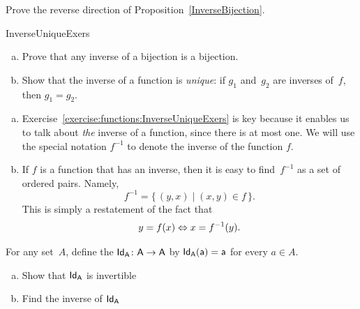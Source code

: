 \begin{exercise}{}
Prove the reverse direction of Proposition~\ref{InverseBijection}.
\end{exercise}

 \begin{exercise}{InverseUniqueExers} 
 \begin{enumerate}[(a)]
 \item \label{InverseUniqueExers-bij}
 Prove that any inverse of a bijection is a bijection.
 \item \label{InverseUniqueExers-unique}
 Show that the inverse of a function is \emph{unique}: if $g_1$ and~$g_2$ are inverses of~$f$, then $g_1 = g_2$. 
 \end{enumerate}
 \end{exercise}

\begin{rem}
\begin{enumerate}[(a)]
\item
Exercise~\ref{exercise:functions:InverseUniqueExers} is key because it enables us to talk about \emph{the} inverse of a function, since there is at most one. We will use the special notation $f^{-1}$ to denote the inverse of the function $f$.
\item
If $f$ is a function that has an inverse, then it is easy to find~$f^{-1}$ as a set of ordered pairs. Namely, 
$$ f^{-1} = \{\, (y,x) \mid (x,y) \in f \,\} .$$
This is simply a restatement of the fact that
 $$y = f(x) \Leftrightarrow x = f^{-1}(y) .$$
\end{enumerate}
\end{rem}

\begin{defn}{}
For any set~$A$, define the  $\sf{Id}_A \colon A \to A$ by $\sf{Id}_A(a) = a$ for every $a \in A$.
\end{defn} 

\begin{exercise}{98}
\begin{enumerate}[(a)]
\item
Show that $\sf{Id}_A$ is invertible
\item
Find the inverse of $\sf{Id}_A$
\end{enumerate}
\end{exercise}

